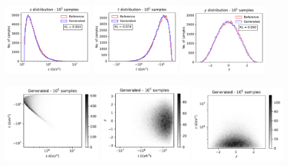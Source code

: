 \documentclass[twocolumn,preprintnumbers,superscriptaddress]{revtex4-2}
\begin{document}
\begin{figure}

  \includegraphics[width=0.29\textwidth]{plots/LHCttbar/s-distribution_LHCdata_100k.pdf}%
  \includegraphics[width=0.29\textwidth]{plots/LHCttbar/t-distribution_LHCdata_100k.pdf}%
  \includegraphics[width=0.29\textwidth]{plots/LHCttbar/y-distribution_LHCdata_100k.pdf}
  
  \includegraphics[width=0.32\textwidth]{plots/LHCttbar/s-t_FAKE_100k.pdf}%
  \includegraphics[width=0.3\textwidth]{plots/LHCttbar/t-y_FAKE_100k.pdf}%
  \includegraphics[width=0.31\textwidth]{plots/LHCttbar/y-s_FAKE_100k.pdf}


\end{figure}
\end{document}

